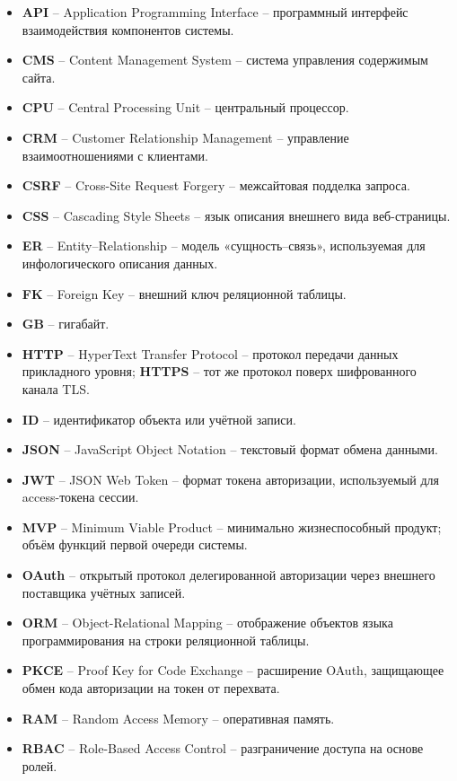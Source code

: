 \begin{itemize}[leftmargin=0pt, itemindent=1.5cm, labelsep=0pt, label={}]
\item \textbf{API} -- Application Programming Interface -- программный интерфейс взаимодействия компонентов системы.
\item \textbf{CMS} -- Content Management System -- система управления содержимым сайта.
\item \textbf{CPU} -- Central Processing Unit -- центральный процессор.
\item \textbf{CRM} -- Customer Relationship Management -- управление взаимоотношениями с клиентами.
\item \textbf{CSRF} -- Cross-Site Request Forgery -- межсайтовая подделка запроса.
\item \textbf{CSS} -- Cascading Style Sheets -- язык описания внешнего вида веб-страницы.
\item \textbf{ER} -- Entity--Relationship -- модель «сущность--связь», используемая для инфологического описания данных.
\item \textbf{FK} -- Foreign Key -- внешний ключ реляционной таблицы.
\item \textbf{GB} -- гигабайт.
\item \textbf{HTTP} -- HyperText Transfer Protocol -- протокол передачи данных прикладного уровня; \textbf{HTTPS} -- тот же протокол поверх шифрованного канала TLS.
\item \textbf{ID} -- идентификатор объекта или учётной записи.
\item \textbf{JSON} -- JavaScript Object Notation -- текстовый формат обмена данными.
\item \textbf{JWT} -- JSON Web Token -- формат токена авторизации, используемый для access-токена сессии.
\item \textbf{MVP} -- Minimum Viable Product -- минимально жизнеспособный продукт; объём функций первой очереди системы.
\item \textbf{OAuth} -- открытый протокол делегированной авторизации через внешнего поставщика учётных записей.
\item \textbf{ORM} -- Object-Relational Mapping -- отображение объектов языка программирования на строки реляционной таблицы.
\item \textbf{PKCE} -- Proof Key for Code Exchange -- расширение OAuth, защищающее обмен кода авторизации на токен от перехвата.
\item \textbf{RAM} -- Random Access Memory -- оперативная память.
\item \textbf{RBAC} -- Role-Based Access Control -- разграничение доступа на основе ролей.

\end{itemize}
